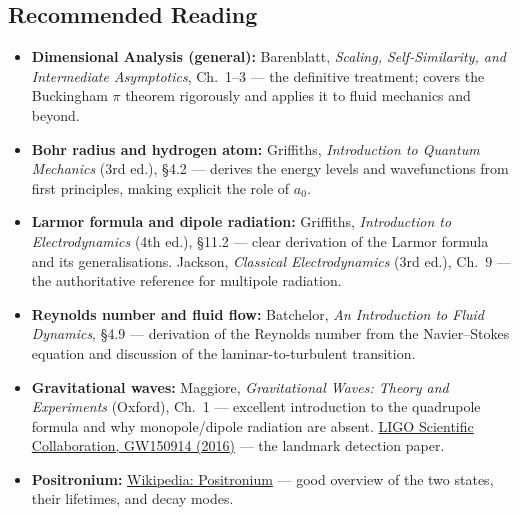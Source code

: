 \subsection*{Recommended Reading}

\begin{itemize}
    \item \textbf{Dimensional Analysis (general):} Barenblatt,
    \textit{Scaling, Self-Similarity, and Intermediate Asymptotics}, Ch.~1–3 —
    the definitive treatment; covers the Buckingham $\pi$ theorem rigorously
    and applies it to fluid mechanics and beyond.

    \item \textbf{Bohr radius and hydrogen atom:} Griffiths,
    \textit{Introduction to Quantum Mechanics} (3rd ed.), §4.2 — derives the
    energy levels and wavefunctions from first principles, making explicit the
    role of $a_0$.

    \item \textbf{Larmor formula and dipole radiation:} Griffiths,
    \textit{Introduction to Electrodynamics} (4th ed.), §11.2 — clear
    derivation of the Larmor formula and its generalisations.
    Jackson, \textit{Classical Electrodynamics} (3rd ed.), Ch.~9 — the
    authoritative reference for multipole radiation.

    \item \textbf{Reynolds number and fluid flow:} Batchelor,
    \textit{An Introduction to Fluid Dynamics}, §4.9 — derivation of the
    Reynolds number from the Navier–Stokes equation and discussion of the
    laminar-to-turbulent transition.

    \item \textbf{Gravitational waves:} Maggiore,
    \textit{Gravitational Waves: Theory and Experiments} (Oxford), Ch.~1 —
    excellent introduction to the quadrupole formula and why monopole/dipole
    radiation are absent.
    \href{https://www.ligo.org/science/Publication-GW150914/}{LIGO Scientific
    Collaboration, GW150914 (2016)} — the landmark detection paper.

    \item \textbf{Positronium:}
    \href{https://en.wikipedia.org/wiki/Positronium}{Wikipedia: Positronium}
    — good overview of the two states, their lifetimes, and decay modes.
\end{itemize}
